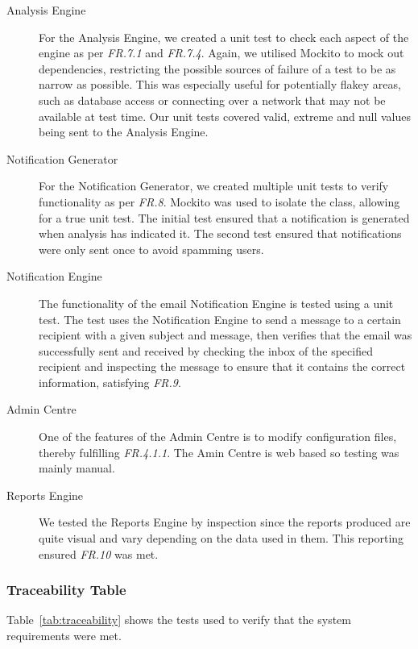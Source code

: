 \documentclass[10pt,a4paper]{article}
\begin{document}
\begin{description}
  \item[Analysis Engine] For the Analysis Engine, we created a unit test to check each aspect of the engine as per \emph{FR.7.1} and \emph{FR.7.4}. Again, we utilised Mockito to mock out dependencies, restricting the possible sources of failure of a test to be as narrow as possible. This was especially useful for potentially flakey areas, such as database access or connecting over a network that may not be available at test time. Our unit tests covered valid, extreme and null values being sent to the Analysis Engine.

  \item[Notification Generator] For the Notification Generator, we created multiple unit tests to verify functionality as per \emph{FR.8}. Mockito was used to isolate the class, allowing for a true unit test. The initial test ensured that a notification is generated when analysis has indicated it. The second test ensured that notifications were only sent once to avoid spamming users.	 

  \item[Notification Engine] The functionality of the email Notification Engine is tested using a unit test. The test uses the Notification Engine to send a message to a certain recipient with a given subject and message, then verifies that the email was successfully sent and received by checking the inbox of the specified recipient and inspecting the message to ensure that it contains the correct information, satisfying \emph{FR.9}.

  \item[Admin Centre] One of the features of the Admin Centre is to modify configuration files, thereby fulfilling \emph{FR.4.1.1}. The Amin Centre is web based so testing was mainly manual.

  \item[Reports Engine] We tested the Reports Engine by inspection since the reports produced are quite visual and vary depending on the data used in them. This reporting ensured \emph{FR.10} was met.

 \end{description}

\subsubsection{Traceability Table}

Table~\ref{tab:traceability} shows the tests used to verify that the system requirements were met.
\end{document}

